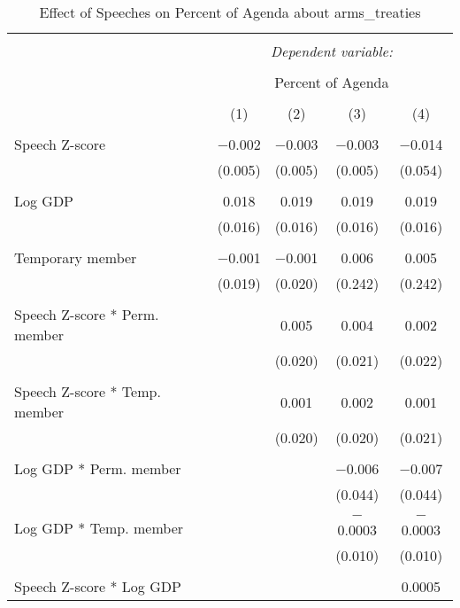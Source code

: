 
\begin{table}[!htbp] \centering 
  \caption{Effect of Speeches on Percent of Agenda about arms_treaties} 
  \label{} 
\begin{tabular}{@{\extracolsep{5pt}}lcccc} 
\\[-1.8ex]\hline 
\hline \\[-1.8ex] 
 & \multicolumn{4}{c}{\textit{Dependent variable:}} \\ 
\cline{2-5} 
\\[-1.8ex] & \multicolumn{4}{c}{Percent of Agenda} \\ 
\\[-1.8ex] & (1) & (2) & (3) & (4)\\ 
\hline \\[-1.8ex] 
 Speech Z-score & $-$0.002 & $-$0.003 & $-$0.003 & $-$0.014 \\ 
  & (0.005) & (0.005) & (0.005) & (0.054) \\ 
  & & & & \\ 
 Log GDP & 0.018 & 0.019 & 0.019 & 0.019 \\ 
  & (0.016) & (0.016) & (0.016) & (0.016) \\ 
  & & & & \\ 
 Temporary member & $-$0.001 & $-$0.001 & 0.006 & 0.005 \\ 
  & (0.019) & (0.020) & (0.242) & (0.242) \\ 
  & & & & \\ 
 Speech Z-score * Perm. member &  & 0.005 & 0.004 & 0.002 \\ 
  &  & (0.020) & (0.021) & (0.022) \\ 
  & & & & \\ 
 Speech Z-score * Temp. member &  & 0.001 & 0.002 & 0.001 \\ 
  &  & (0.020) & (0.020) & (0.021) \\ 
  & & & & \\ 
 Log GDP * Perm. member &  &  & $-$0.006 & $-$0.007 \\ 
  &  &  & (0.044) & (0.044) \\ 
  & & & & \\ 
 Log GDP * Temp. member &  &  & $-$0.0003 & $-$0.0003 \\ 
  &  &  & (0.010) & (0.010) \\ 
  & & & & \\ 
 Speech Z-score * Log GDP &  &  &  & 0.0005 \\ 

\end{tabular}
\end{table}
